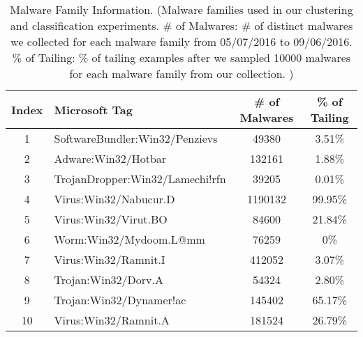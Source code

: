 \begin{table}
  \centering
  \scriptsize
  \begin{tabular}{clcc}
    \toprule
{\bf Index} & {\bf Microsoft Tag} & {\bf \# of Malwares} & {\bf \% of Tailing} \\
\midrule                                                                                                                                                                                                                                           
1  &  SoftwareBundler:Win32/Penzievs 	& 49380	   & 3.51\%  \\
2  &  Adware:Win32/Hotbar               & 132161   & 1.88\%  \\
3  &  TrojanDropper:Win32/Lamechi!rfn	& 39205	   & 0.01\%  \\
4  &  Virus:Win32/Nabucur.D	            & 1190132  & 99.95\% \\
5  &  Virus:Win32/Virut.BO	            & 84600	   & 21.84\% \\
6  &  Worm:Win32/Mydoom.L@mm	        & 76259	   & 0\%     \\
7  &  Virus:Win32/Ramnit.I              & 412052   & 3.07\%  \\
8  &  Trojan:Win32/Dorv.A               & 54324    & 2.80\%  \\
9  &  Trojan:Win32/Dynamer!ac           & 145402   & 65.17\% \\
10 &  Virus:Win32/Ramnit.A              & 181524   & 26.79\% \\   

\bottomrule
   \end{tabular}
  \caption{Malware Family Information.
  \footnotesize{(Malware families used in our clustering and classification experiments. \# of Malwares: \# of distinct malwares we collected for each malware family from 05/07/2016 to 09/06/2016. \% of Tailing: \% of tailing examples after we sampled 10000 malwares for each malware family from our collection.  
  ) 
}
 }
  \label{tab:benchmarks}
\end{table}


